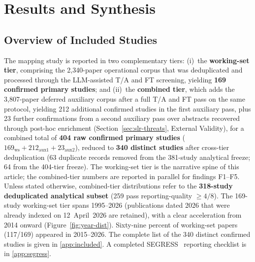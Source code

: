 \section{Results and Synthesis}
\label{sec:slr-synthesis}

\subsection{Overview of Included Studies}

The mapping study is reported in two complementary tiers: (i)~the
\textbf{working-set tier}, comprising the 2{,}340-paper operational corpus
that was deduplicated and processed through the LLM-assisted T/A and FT
screening, yielding \textbf{169 confirmed primary studies}; and (ii)~the
\textbf{combined tier}, which adds the 3{,}807-paper deferred auxiliary
corpus after a full T/A and FT pass on the same protocol, yielding 212
additional confirmed studies in the first auxiliary pass, plus 23 further
confirmations from a second auxiliary pass over abstracts recovered through
post-hoc enrichment (Section~\ref{sec:slr-threats}, External Validity), for
a combined total of \textbf{404 raw confirmed primary studies}
($169_{\text{ws}} + 212_{\text{aux1}} + 23_{\text{aux2}}$), reduced to
\textbf{340 distinct studies} after cross-tier deduplication (63 duplicate
records removed from the 381-study analytical freeze; 64 from the 404-tier
freeze). The working-set tier is the narrative spine of this article; the
combined-tier numbers are reported in parallel for findings F1--F5. Unless
stated otherwise, combined-tier distributions refer to the
\textbf{318-study deduplicated analytical subset} (259 pass reporting-quality
$\geq 4/8$). The 169-study working-set tier spans 1995--2026 (publications dated 2026
that were already indexed on 12~April~2026 are retained), with a clear
acceleration from 2014 onward (Figure~\ref{fig:year-dist}). Sixty-nine
percent of working-set papers (117/169) appeared in 2015--2026. The complete
list of the 340 distinct confirmed studies is given in \ref{app:included}.
A completed SEGRESS~\cite{kitchenham2023segress} reporting checklist is in
\ref{app:segress}.

